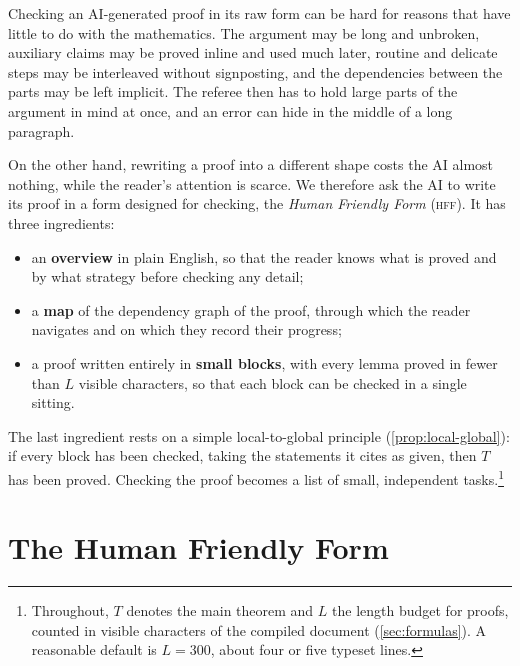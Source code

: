 \documentclass[11pt]{article}
\theoremstyle{plain}
\theoremstyle{definition}
\theoremstyle{remark}
\theoremstyle{definition}
\theoremstyle{plain}
\theoremstyle{remark}
\newcommand{\HFF}{\textsc{hff}}
\begin{document}
Checking an AI-generated proof in its raw form can be hard for reasons that have little to do with the mathematics. The argument may be long and unbroken, auxiliary claims may be proved inline and used much later, routine and delicate steps may be interleaved without signposting, and the dependencies between the parts may be left implicit. The referee then has to hold large parts of the argument in mind at once, and an error can hide in the middle of a long paragraph.

On the other hand, rewriting a proof into a different shape costs the AI almost nothing, while the reader's attention is scarce. We therefore ask the AI to write its proof in a form designed for checking, the \emph{Human Friendly Form} (\HFF). It has three ingredients:
\begin{itemize}[leftmargin=2em]
  \item an \textbf{overview} in plain English, so that the reader knows what is proved and by what strategy before checking any detail;
  \item a \textbf{map} of the dependency graph of the proof, through which the reader navigates and on which they record their progress;
  \item a proof written entirely in \textbf{small blocks}, with every lemma proved in fewer than $L$ visible characters, so that each block can be checked in a single sitting.
\end{itemize}
The last ingredient rests on a simple local-to-global principle (\cref{prop:local-global}): if every block has been checked, taking the statements it cites as given, then $T$ has been proved. Checking the proof becomes a list of small, independent tasks.\footnote{Throughout, $T$ denotes the main theorem and $L$ the length budget for proofs, counted in visible characters of the compiled document (\cref{sec:formulas}). A reasonable default is $L = 300$, about four or five typeset lines.}

\section{The Human Friendly Form}\label{sec:hff}
\end{document}
